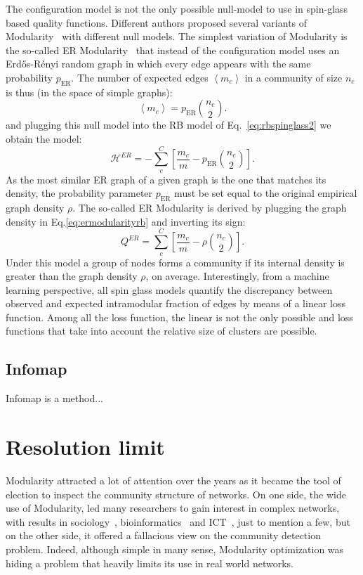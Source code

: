 The configuration model is not the only possible null-model to use in spin-glass based quality functions. Different authors proposed several variants of Modularity~\cite{ronhovde2010,ronhovde2009,traag2011} with different null models.
The simplest variation of Modularity is the so-called ER Modularity~\cite{traag2015} that instead of the configuration model uses an Erd\H{o}s-Rényi random graph in which every edge appears with the same probability $p_{\textrm{ER}}$. The number of expected edges $\left< m_c \right>$ in a community of size $n_c$ is thus (in the space of simple graphs):
\begin{equation}
\left< m_c \right> = p_{\textrm{ER}}\binom{n_c}{2}.
\end{equation}
and plugging this null model into the RB model of Eq.~\ref{eq:rbspinglass2} we obtain the model:
\begin{equation}\label{eq:ermodularityrb}
\mathcal{H}^{ER} = -\sum \limits_c^C \left[\frac{m_c}{m}  - p_{\textrm{ER}}\binom{n_c}{2} \right].
\end{equation}
As the most similar ER graph of a given graph is the one that matches its density, the probability parameter $p_{\textrm{ER}}$ must be set equal to the original empirical graph density $\rho$. The so-called ER Modularity is derived by plugging the graph density in Eq.\ref{eq:ermodularityrb} and inverting its sign: 
\begin{equation}
Q^{ER} = \sum \limits_c^C \left[\frac{m_c}{m}  - \rho \binom{n_c}{2} \right].
\end{equation}
Under this model a group of nodes forms a community if its internal density is greater than the graph density $\rho$, on average.
Interestingly, from a machine learning perspective, all spin glass models quantify the discrepancy between observed and expected intramodular fraction of edges by means of a linear loss function. Among all the loss function, the linear is not the only possible and loss functions that take into account the relative size of clusters are possible.

\subsection{Infomap}
Infomap is a method...

\section{Resolution limit}\label{sec:resolutionlimit}
Modularity attracted a lot of attention over the years as it became the tool of election to inspect the community structure of networks.
On one side, the wide use of Modularity, led many researchers to gain interest in complex networks, with results in sociology~\cite{li2008tag}, bioinformatics~\cite{saracc2012topology} and ICT~\cite{java2007we,leskovec2007dynamics}, just to mention a few, but on the other side, it offered a fallacious view on the community detection problem.
Indeed, although simple in many sense, Modularity optimization was hiding a problem that heavily limits its use in real world networks.

